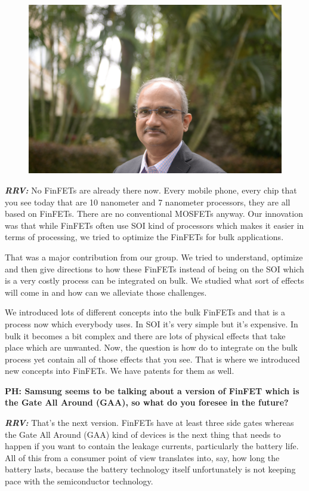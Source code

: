 \begin{multicols}{2}
\setcounter{figure}{0}
\begin{figure}[H]
\centering
\includegraphics[scale=.5]{src/Figures/interview/interview-fig06.jpg}
\end{figure}

\textbf{\textit{RRV:}} No FinFETs are already there now. Every mobile phone, every chip that you see today that are 10 nanometer and 7 nanometer processors, they are all based on FinFETs. There are no conventional MOSFETs anyway. Our innovation was that while FinFETs often use SOI kind of processors which makes it easier in terms of processing, we tried to optimize the FinFETs for bulk applications.

That was a major contribution from our group. We tried to understand, optimize and then give directions to how these FinFETs instead of being on the SOI which is a very costly process can be integrated on bulk. We studied what sort of effects will come in and how can we alleviate those challenges.

We introduced lots of different concepts into the bulk FinFETs and that is a process now which everybody uses. In SOI it’s very simple but it’s expensive. In bulk it becomes a bit complex and there are lots of physical effects that take place which are unwanted. Now, the question is how do to integrate on the bulk process yet contain all of those effects that you see. That is where we introduced new concepts into FinFETs. We have patents for them as well.

\textbf{PH: Samsung seems to be talking about a version of FinFET which is the Gate All Around (GAA), so what do you foresee in the future?}

\textbf{\textit{RRV: }} That’s the next version. FinFETs have at least three side gates whereas the Gate All Around (GAA) kind of devices is the next thing that needs to happen if you want to contain the leakage currents, particularly the battery life. All of this from a consumer point of view translates into, say, how long the battery lasts, because the battery technology itself unfortunately is not keeping pace with the semiconductor technology.
 

\end{multicols}
